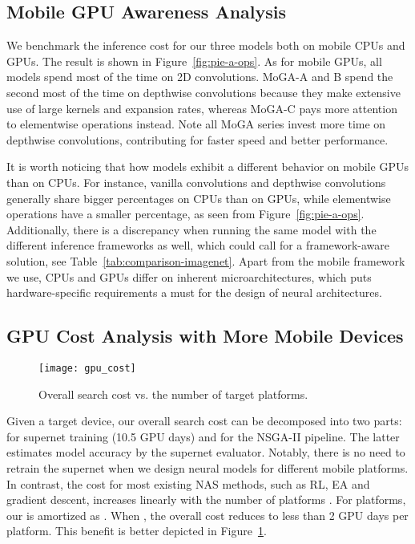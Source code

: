 \documentclass[letterpaper]{article} \usepackage{aaai20}  \usepackage{times}  \usepackage{helvet} \usepackage{courier}  \usepackage[hyphens]{url}  \usepackage{graphicx} \urlstyle{rm} \def\UrlFont{\rm}  \usepackage{graphicx}  \usepackage{amsmath}
\begin{document}
\subsection{Mobile GPU Awareness Analysis}
We benchmark the inference cost for our three models both on mobile CPUs and GPUs. The result is shown in Figure~\ref{fig:pie-a-ops}. As for mobile GPUs, all models spend most of the time on 2D convolutions. MoGA-A and B spend the second most of the time on depthwise convolutions because they make extensive use of large kernels and expansion rates, whereas MoGA-C pays more attention to elementwise operations instead. Note all MoGA series invest more time on depthwise convolutions, contributing for faster speed and better performance.

It is worth noticing that how models exhibit a different behavior on mobile GPUs than on CPUs. For instance, vanilla convolutions and depthwise convolutions generally share bigger percentages on CPUs than on GPUs, while elementwise operations have a smaller percentage, as seen from Figure~\ref{fig:pie-a-ops}. Additionally, there is a discrepancy when running the same model with the different inference frameworks as well, which could call for a framework-aware solution, see Table~\ref{tab:comparison-imagenet}. Apart from the mobile framework we use, CPUs and GPUs differ on inherent microarchitectures, which puts hardware-specific requirements a must for the design of neural architectures.

\subsection{GPU Cost Analysis with More Mobile Devices}
\begin{figure}[ht]
\centering
{
\texttt{[image: gpu\_cost]}
}
\caption{Overall search cost vs. the number of target platforms.}
\label{fig:gpu-cost}
\end{figure} 
Given a target device, our overall search cost  can be decomposed into two parts:  for supernet training (10.5 GPU days) and  for the NSGA-II pipeline. The latter estimates model accuracy by the supernet evaluator. Notably, there is no need to retrain the supernet when we design neural models for different mobile platforms. In contrast, the cost for most existing NAS methods, such as RL, EA and gradient descent, increases linearly with the number of platforms \cite{tan2018mnasnet,wu2018fbnet,cai2018proxylessnas,liu2018darts}. For  platforms, our  is amortized as . When , the overall cost  reduces to less than 2 GPU days per platform. This benefit is better depicted in Figure~\ref{fig:gpu-cost}.
\end{document}

